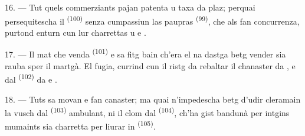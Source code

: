 16. --- Tut quels commerziants pajan patenta u taxa da plaz; perquai persequitescha
il  \textsuperscript{(100)} senza cumpassiun las paupras  \textsuperscript{(99)}, che als fan concurrenza, purtond enturn cun lur charrettas
 u  e .

\VUsaut{4.0mm}
\VUsaut{3.0mm}

17. --- Il mat che venda  \textsuperscript{(101)} e  sa fitg
bain
ch'era el na dastga betg vender sia rauba sper il martgà. El fugia, currind cun il
ristg da rebaltar il chanaster da ,  e
 dal  \textsuperscript{(102)} da  e
.

18. --- Tuts sa movan e fan canaster; ma quai n'impedescha betg d'udir cleramain la
vusch dal  \textsuperscript{(103)} ambulant, ni il clom dal 
\textsuperscript{(104)}, ch'ha gist bandunà per intgins mumaints sia charretta per liurar
in  \textsuperscript{(105)}.

\VUsaut{6.0mm}
\VUfilet{22mm}
